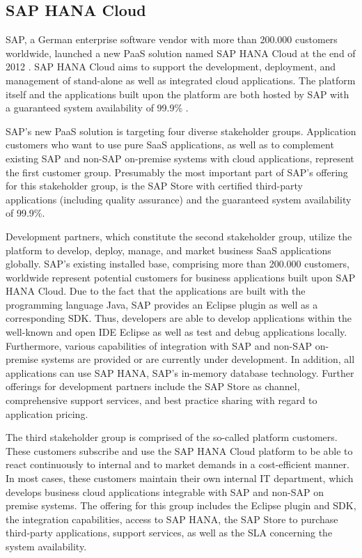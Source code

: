 \newpage


\subsection{SAP HANA Cloud}\label{ch:sota:sap}

SAP, a German enterprise software vendor with more than 200.000 customers worldwide, launched a new \ac{PaaS} solution named SAP HANA Cloud at the end of 2012 \citep{SAP2013b,SAP2013a}. SAP HANA Cloud aims to support the development, deployment, and management of stand-alone as well as integrated cloud applications. The platform itself and the applications built upon the platform are both hosted by SAP with a guaranteed system availability of 99.9\% \citep{SAP2013b}.

SAP's new \ac{PaaS} solution is targeting four diverse stakeholder groups. Application customers who want to use pure \ac{SaaS} applications, as well as to complement existing SAP and non-SAP on-premise systems with cloud applications, represent the first customer group. Presumably the most important part of SAP's offering for this stakeholder group, is the SAP Store with certified third-party applications (including quality assurance) and the guaranteed system availability of 99.9\%.

Development partners, which constitute the second stakeholder group, utilize the platform to develop, deploy, manage, and market business \ac{SaaS} applications globally. SAP's existing installed base, comprising more than 200.000 customers, worldwide represent potential customers for business applications built upon SAP HANA Cloud. Due to the fact that the applications are built with the programming language Java, SAP provides an Eclipse plugin as well as a corresponding \ac{SDK}. Thus, developers are able to develop applications within the well-known and open \ac{IDE} Eclipse as well as test and debug applications locally. Furthermore, various capabilities of integration with SAP and non-SAP on-premise systems are provided or are currently under development. In addition, all applications can use SAP HANA, SAP's in-memory database technology. Further offerings for development partners include the SAP Store as channel, comprehensive support services, and best practice sharing with regard to application pricing.

The third stakeholder group is comprised of the so-called platform customers. These customers subscribe and use the SAP HANA Cloud platform to be able to react continuously to internal and to market demands in a cost-efficient manner. In most cases, these customers maintain their own internal \ac{IT} department, which develops business cloud applications integrable with SAP and non-SAP on premise systems. The offering for this group includes the Eclipse plugin and \ac{SDK}, the integration capabilities, access to SAP HANA, the SAP Store to purchase third-party applications, support services, as well as the \ac{SLA} concerning the system availability.

